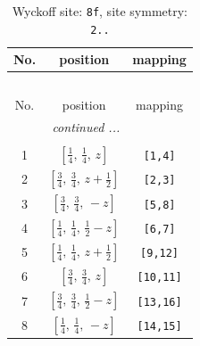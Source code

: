 \documentclass[fleqn,8pt]{jsarticle}
\begin{document}
\begin{longtable}{ccc}
\caption{Wyckoff site: {\tt 8f}, site symmetry: {\tt 2..}}
 \\
 \hline \hline
No. & position & mapping \\ \hline \endfirsthead

\multicolumn{2}{l}{\tablename\ \thetable{}} \\
 \hline \hline
No. & position & mapping \\ \hline \endhead

 \hline \hline
\multicolumn{2}{r}{\footnotesize\it continued ...} \\ \endfoot

 \hline \hline
\multicolumn{2}{r}{} \\ \endlastfoot

1 & $\left[ \frac{1}{4},\, \frac{1}{4},\, z \right]$ & {\tt [1,4]} \\ \hline
2 & $\left[ \frac{3}{4},\, \frac{3}{4},\, z + \frac{1}{2} \right]$ & {\tt [2,3]} \\ \hline
3 & $\left[ \frac{3}{4},\, \frac{3}{4},\, - z \right]$ & {\tt [5,8]} \\ \hline
4 & $\left[ \frac{1}{4},\, \frac{1}{4},\, \frac{1}{2} - z \right]$ & {\tt [6,7]} \\ \hline
5 & $\left[ \frac{1}{4},\, \frac{1}{4},\, z + \frac{1}{2} \right]$ & {\tt [9,12]} \\ \hline
6 & $\left[ \frac{3}{4},\, \frac{3}{4},\, z \right]$ & {\tt [10,11]} \\ \hline
7 & $\left[ \frac{3}{4},\, \frac{3}{4},\, \frac{1}{2} - z \right]$ & {\tt [13,16]} \\ \hline
8 & $\left[ \frac{1}{4},\, \frac{1}{4},\, - z \right]$ & {\tt [14,15]} \\
\end{longtable}
\renewcommand{\arraystretch}{1.2}
\end{document}
